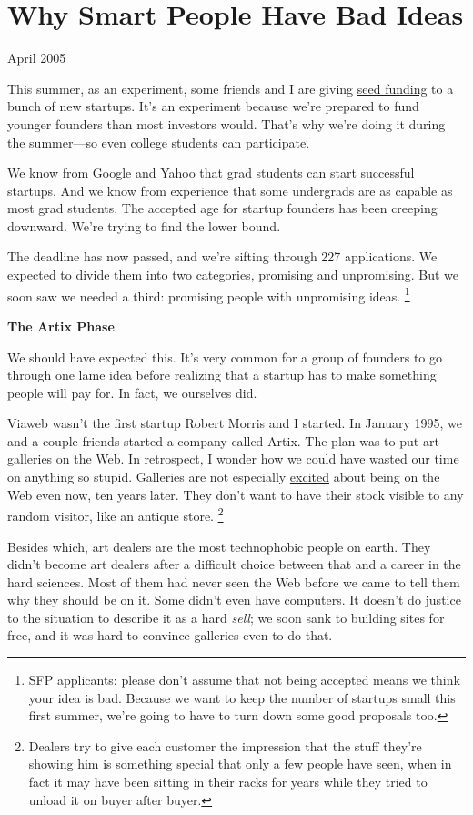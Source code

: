 \chapter{Why Smart People Have Bad Ideas}

April 2005

This summer, as an experiment, some friends and I are giving
\href{http://ycombinator.com}{seed funding} to a bunch of new startups.
It's an experiment because we're prepared to fund younger founders than
most investors would. That's why we're doing it during the summer---so
even college students can participate.

We know from Google and Yahoo that grad students can start successful
startups. And we know from experience that some undergrads are as
capable as most grad students. The accepted age for startup founders has
been creeping downward. We're trying to find the lower bound.

The deadline has now passed, and we're sifting through 227 applications.
We expected to divide them into two categories, promising and
unpromising. But we soon saw we needed a third: promising people with
unpromising ideas. \footnote{SFP applicants: please don't assume that not being accepted
means we think your idea is bad. Because we want to keep the number of
startups small this first summer, we're going to have to turn down some
good proposals too.}

\textbf{The Artix Phase}

We should have expected this. It's very common for a group of founders
to go through one lame idea before realizing that a startup has to make
something people will pay for. In fact, we ourselves did.

Viaweb wasn't the first startup Robert Morris and I started. In January
1995, we and a couple friends started a company called Artix. The plan
was to put art galleries on the Web. In retrospect, I wonder how we
could have wasted our time on anything so stupid. Galleries are not
especially \href{http://www.knoedlergallery.com/}{excited} about being
on the Web even now, ten years later. They don't want to have their
stock visible to any random visitor, like an antique store.
\footnote{Dealers try to give each customer the impression that the stuff
they're showing him is something special that only a few people have
seen, when in fact it may have been sitting in their racks for years
while they tried to unload it on buyer after buyer.}

Besides which, art dealers are the most technophobic people on earth.
They didn't become art dealers after a difficult choice between that and
a career in the hard sciences. Most of them had never seen the Web
before we came to tell them why they should be on it. Some didn't even
have computers. It doesn't do justice to the situation to describe it as
a hard \emph{sell}; we soon sank to building sites for free, and it was
hard to convince galleries even to do that.

